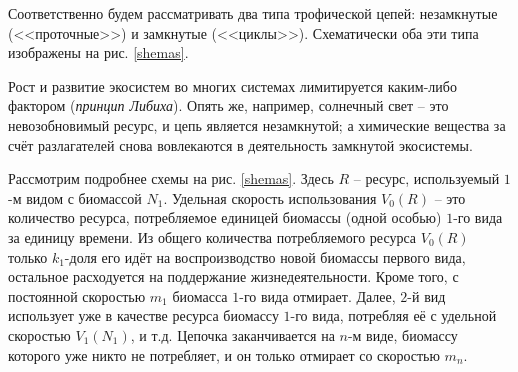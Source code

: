 Соответственно будем рассматривать два типа трофической цепей: незамкнутые (<<проточные>>) и замкнутые (<<циклы>>). Схематически оба эти типа изображены на рис. \ref{shemas}.

Рост и развитие экосистем во многих системах лимитируется каким-либо фактором (\textit{принцип Либиха}). Опять же, например, солнечный свет -- это невозобновимый ресурс, и цепь является незамкнутой; а химические вещества за счёт разлагателей снова вовлекаются в деятельность замкнутой экосистемы.

Рассмотрим подробнее схемы на рис. \ref{shemas}. Здесь \(R\) -- ресурс, используемый \(1\)-м видом с биомассой \(N_1\). Удельная скорость использования \(V_0(R)\) -- это количество ресурса, потребляемое единицей биомассы (одной особью) \(1\)-го вида за единицу времени. Из общего количества потребляемого ресурса \(V_0(R)\) только \(k_1\)-доля его идёт на воспроизводство новой биомассы первого вида, остальное расходуется на поддержание жизнедеятельности. Кроме того, с постоянной скоростью \(m_1\) биомасса \(1\)-го вида отмирает. Далее, \(2\)-й вид использует уже в качестве ресурса биомассу \(1\)-го вида, потребляя её с удельной скоростью \(V_1(N_1)\), и т.д. Цепочка заканчивается на \(n\)-м виде, биомассу которого уже никто не потребляет, и он только отмирает со скоростью \(m_n\).


